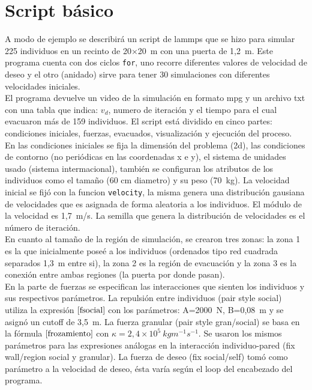 \section{Script básico}

A modo de ejemplo se describirá un script de lammps que se hizo para simular 225 individuos en un recinto de 20$\times$20~m con una puerta de 1,2~m. Este programa cuenta con dos ciclos {\tt for}, uno recorre diferentes valores de velocidad de deseo y el otro (anidado) sirve para tener 30 simulaciones con diferentes velocidades iniciales. \\
El programa devuelve un video de la simulación en formato mpg y un archivo txt con una tabla que indica: $v_d$, numero de iteración y el tiempo para el cual evacuaron más de 159 individuos.
El script está dividido en cinco partes: condiciones iniciales, fuerzas, evacuados, visualización y ejecución del proceso.\\ 
En las condiciones iniciales se fija la dimensión del problema (2d), las condiciones de contorno (no periódicas en las coordenadas x e y), el sistema de unidades usado (sistema intermacional), también se configuran los atributos de los individuos como el tamaño (60 cm diametro) y su peso (70~kg). La velocidad inicial se fijó con la funcion {\tt velocity}, la misma genera una distribución gausiana de velocidades que es asignada de forma aleatoria a los individuos. El módulo de la velocidad es 1,7~m/s. La semilla que genera la distribución de velocidades es el número de iteración.\\
En cuanto al tamaño de la región de simulación, se crearon tres zonas: la zona 1 es la que inicialmente poseé a los individuos (ordenados tipo red cuadrada separados 1,3~m entre si), la zona 2 es la región de evacuación y la zona 3 es la conexión entre ambas regiones (la puerta por donde pasan).\\
En la parte de fuerzas se especifican las interacciones que sienten los individuos y sus respectivos parámetros. La repulsión entre individuos (pair style social) utiliza la expresión $\ref{fsocial}$ con los parámetros: A=2000~N, B=0,08~m y se asignó un cutoff de 3,5~m. La fuerza granular (pair style gran/social) se basa en la fórmula $\ref{frozamiento}$ con $\kappa =2,4 \times 10^5~kgm^{-1}s^{-1}$. Se usaron los mismos parámetros para las expresiones análogas en la interacción individuo-pared (fix wall/region social y granular). La fuerza de deseo (fix social/self) tomó como parámetro a la velocidad de deseo, ésta varía según el loop del encabezado del programa. \\
